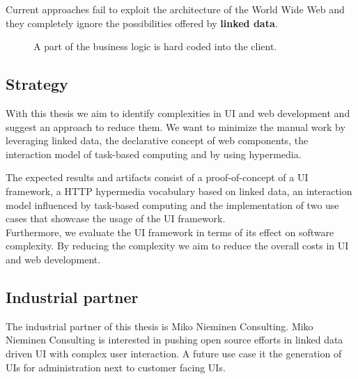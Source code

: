 Current approaches fail to exploit the architecture of the World Wide Web and they completely ignore the possibilities offered by \textbf{linked data}.

\begin{figure}[!htb]
  \caption{\label{fig:my-label} A part of the business logic is hard coded into the client.}
\end{figure}

\subsection{Strategy}\label{strategy}
With this thesis we aim to identify complexities in UI and web development and suggest an approach to reduce them.
We want to minimize the manual work by leveraging linked data, the declarative concept of web components, the interaction model of task-based computing and by using hypermedia.

The expected results and artifacts consist of a proof-of-concept of a UI framework, a HTTP hypermedia vocabulary based on linked data, an interaction model influenced by task-based computing and the implementation of two use cases that showcase the usage of the UI framework. \\
Furthermore, we evaluate the UI framework in terms of its effect on software complexity. By reducing the complexity we aim to reduce the overall costs in UI and web development.

\subsection{Industrial partner}
The industrial partner of this thesis is Miko Nieminen Consulting. Miko Nieminen Consulting is interested in pushing open source efforts in linked data driven UI with complex user interaction. A future use case it the generation of UIs for administration next to customer facing UIs.
